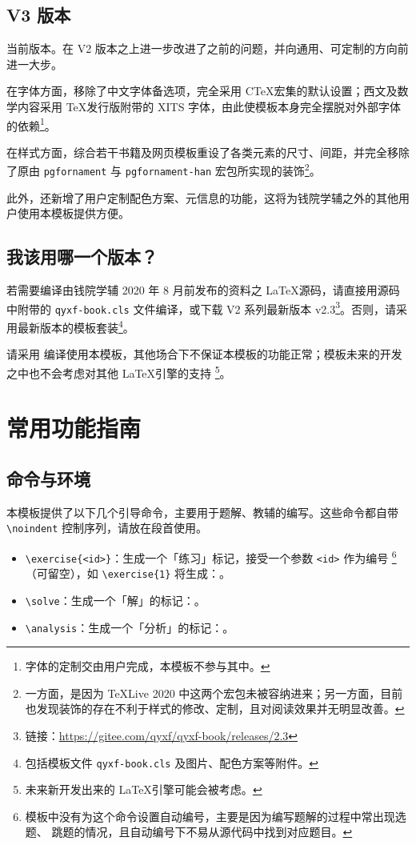 \documentclass[
  10pt,
  twoside,
  openany,
  b5paper, %
  colorscheme = basic %
]{qyxf-book}
\begin{document}
\subsection{V3 版本}

当前版本。在 V2 版本之上进一步改进了之前的问题，并向通用、可定制的方向前进一大步。

在字体方面，移除了中文字体备选项，完全采用 C\TeX 宏集的默认设置；西文及数学内容采用 \TeX 发行版附带的 XITS 字体，由此使模板本身完全摆脱对外部字体的依赖\footnote{字体的定制交由用户完成，本模板不参与其中。}。

在样式方面，综合若干书籍及网页模板重设了各类元素的尺寸、间距，并完全移除了原由 \verb|pgfornament| 与 \verb|pgfornament-han| 宏包所实现的装饰\footnote{一方面，是因为 \TeX Live 2020 中这两个宏包未被容纳进来；另一方面，目前也发现装饰的存在不利于样式的修改、定制，且对阅读效果并无明显改善。}。

此外，还新增了用户定制配色方案、元信息的功能，这将为钱院学辅之外的其他用户使用本模板提供方便。

\subsection{我该用哪一个版本？}

若需要编译由钱院学辅 2020 年 8 月前发布的资料之 \LaTeX 源码，请直接用源码中附带的 \verb|qyxf-book.cls| 文件编译，或下载 V2 系列最新版本 v2.3\footnote{链接：\url{https://gitee.com/qyxf/qyxf-book/releases/2.3}}。否则，请采用最新版本的模板套装\footnote{包括模板文件 \texttt{qyxf-book.cls} 及图片、配色方案等附件。}。


\begin{alert}
  请采用  编译使用本模板，其他场合下不保证本模板的功能正常；模板未来的开发之中也不会考虑对其他 \LaTeX 引擎的支持
  \footnote{未来新开发出来的 \LaTeX 引擎可能会被考虑。}。
\end{alert}

\section{常用功能指南}

\subsection{命令与环境}

本模板提供了以下几个引导命令，主要用于题解、教辅的编写。这些命令都自带 \verb|\noindent| 控制序列，请放在段首使用。

\begin{itemize}
  \item \verb|\exercise{<id>}|：生成一个「练习」标记，接受一个参数 \verb|<id>| 作为编号
        \footnote{模板中没有为这个命令设置自动编号，主要是因为编写题解的过程中常出现选题、
        跳题的情况，且自动编号下不易从源代码中找到对应题目。}
        （可留空），如 \verb|\exercise{1}| 将生成：。
  \item \verb|\solve|：生成一个「解」的标记：\solve。
  \item \verb|\analysis|：生成一个「分析」的标记：\analysis。
\end{itemize}
\end{document}
